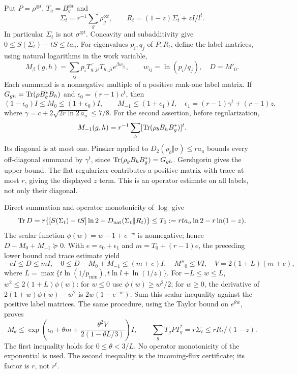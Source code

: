 Put $P=\rho^{\otimes t}$, $T_g=B_g^{\otimes t}$ and
\[
 \Sigma_t=r^{-1}\sum_g\rho_g^{\otimes t},\qquad
 R_t=(1-z)\Sigma_t+zI/l^t.
\]
In particular $\Sigma_t$ is not $\sigma^{\otimes t}$.
Concavity and subadditivity give $0\leq S(\Sigma_t)-tS\leq ta_u$.
For eigenvalues $p_i,q_j$ of $P,R_t$, define the label matrices, using
natural logarithms in the work variable,
\[
 M_\beta(g,h)=\sum_{ij}p_i\overline{T_{g,ji}}T_{h,ji}
 e^{\beta w_{ij}},\qquad w_{ij}=\ln(p_i/q_j),\quad D=M'_0.
\]
Each summand is a nonnegative multiple of a positive rank-one label
matrix. If $G_{gh}=\operatorname{Tr}(\rho B_g^*B_h)$ and
$\epsilon_0=(r-1)c^t$, then
\begin{equation}\label{eq:full-work-moments}
 (1-\epsilon_0)I\leq M_0\leq(1+\epsilon_0)I,\qquad
 M_{-1}\leq(1+\epsilon_1)I,
 \quad \epsilon_1=(r-1)\gamma^t+(r-1)z,
\end{equation}
where $\gamma=c+2\sqrt{2r\ln2\,a_u}\leq7/8$.
For the second assertion, before regularization,
\[
 M_{-1}(g,h)=r^{-1}\sum_b[\operatorname{Tr}(\rho_b B_hB_g^*)]^t.
\]
Its diagonal is at most one. Pinsker applied to
$D_2(\rho_b\Vert\sigma)\leq ra_u$ bounds every off-diagonal summand
by $\gamma^t$, since $\operatorname{Tr}(\rho_gB_hB_g^*)=G_{gh}$.
Gershgorin gives the upper bound. The flat regularizer contributes a
positive matrix with trace at most $r$, giving the displayed $z$ term.
This is an operator estimate on all labels, not only their diagonal.

Direct summation and operator monotonicity of $\log$ give
\[
 \operatorname{Tr} D=r\{[S(\Sigma_t)-tS]\ln2+D_{\rm nat}(\Sigma_t\Vert R_t)\}
 \leq T_0:=rt a_u\ln2-r\ln(1-z).
\]
The scalar function $\phi(w)=w-1+e^{-w}$ is nonnegative; hence
$D-M_0+M_{-1}\succeq0$. With $e=\epsilon_0+\epsilon_1$ and
$m=T_0+(r-1)e$, the preceding lower bound and trace estimate yield
\begin{equation}\label{eq:work-variance}
 -eI\leq D\leq mI,\quad
 0\leq D-M_0+M_{-1}\leq(m+e)I,\quad
 M''_0\leq VI,
 \quad V=2(1+L)(m+e),
\end{equation}
where $L=\max\{t\ln(1/p_{\min}),t\ln l+\ln(1/z)\}$.
For $-L\leq w\leq L$, $w^2\leq2(1+L)\phi(w)$: for $w\leq0$
use $\phi(w)\geq w^2/2$; for $w\geq0$, the derivative of
$2(1+w)\phi(w)-w^2$ is $2w(1-e^{-w})$. Sum this scalar inequality
against the positive label matrices. The same procedure, using the
Taylor bound on $e^{\theta w}$, proves
\begin{equation}\label{eq:work-mgf-gibbs}
 M_\theta\leq
 \exp\!\left(\epsilon_0+\theta m+
 \frac{\theta^2V}{2(1-\theta L/3)}\right)I,
 \qquad \sum_g T_gPT_g^*=r\Sigma_t\leq rR_t/(1-z).
\end{equation}
The first inequality holds for $0\leq\theta<3/L$. No operator
monotonicity of the exponential is used. The second inequality is the
incoming-flux certificate; its factor is $r$, not $r^t$.

